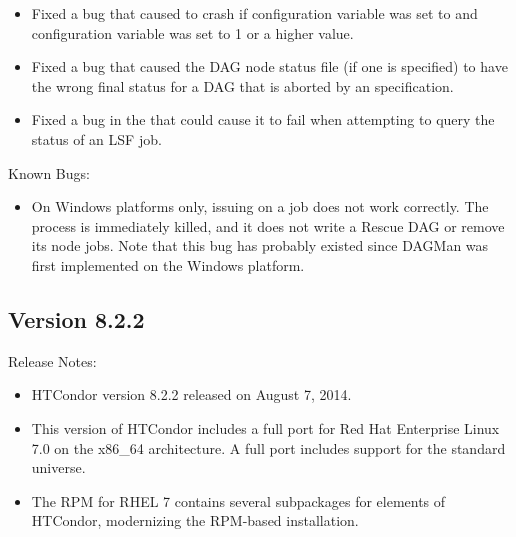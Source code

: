 \begin{itemize}
\item Fixed a bug that caused  to crash if
configuration variable
 was set to  and
configuration variable
 was set to 1 or a higher value.

\item Fixed a bug that caused the DAG node status file (if one is specified)
to have the wrong final status for a DAG that is aborted by an
 specification.

\item Fixed a bug in the  that could cause it to fail
when attempting to query the status of an LSF job.

\end{itemize}

\noindent Known Bugs:

\begin{itemize}

\item On Windows platforms only, issuing  on a 
 job does not work correctly.
The  process is immediately killed,
and it does not write a Rescue DAG or remove its node jobs.
Note that this bug has probably existed since DAGMan was first
implemented on the Windows platform.

\end{itemize}

\subsection*{\label{sec:New-8-2-2}Version 8.2.2}

\noindent Release Notes:

\begin{itemize}

\item HTCondor version 8.2.2 released on August 7, 2014.

\item This version of HTCondor includes a full port for 
Red Hat Enterprise Linux 7.0 on the x86\_64 architecture.
A full port includes support for the standard universe.

\item The RPM for RHEL 7 contains several subpackages for elements of HTCondor,
modernizing the RPM-based installation.

\end{itemize}

